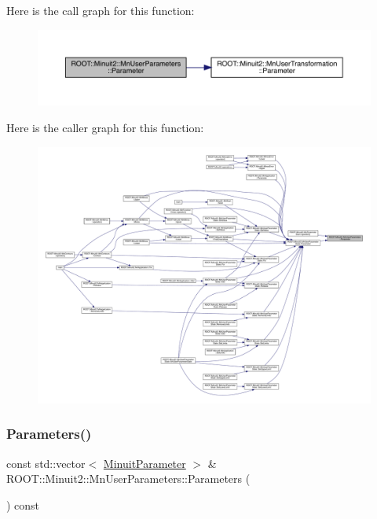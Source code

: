 Here is the call graph for this function\+:
\nopagebreak
\begin{figure}[H]
\begin{center}
\leavevmode
\includegraphics[width=350pt]{d6/d10/classROOT_1_1Minuit2_1_1MnUserParameters_a12ee4c4660c21a660fb5f9d1f30b2fc2_cgraph}
\end{center}
\end{figure}
Here is the caller graph for this function\+:
\nopagebreak
\begin{figure}[H]
\begin{center}
\leavevmode
\includegraphics[width=350pt]{d6/d10/classROOT_1_1Minuit2_1_1MnUserParameters_a12ee4c4660c21a660fb5f9d1f30b2fc2_icgraph}
\end{center}
\end{figure}
\mbox{\label{classROOT_1_1Minuit2_1_1MnUserParameters_a6b6a4cf33fb9e482a193db522763cd76}} 
\subsubsection{\texorpdfstring{Parameters()}{Parameters()}\hspace{0.1cm}{\footnotesize\ttfamily [1/3]}}
{\footnotesize\ttfamily const std\+::vector$<$ \mbox{\hyperlink{classROOT_1_1Minuit2_1_1MinuitParameter}{Minuit\+Parameter}} $>$ \& R\+O\+O\+T\+::\+Minuit2\+::\+Mn\+User\+Parameters\+::\+Parameters (\begin{DoxyParamCaption}{ }\end{DoxyParamCaption}) const}



